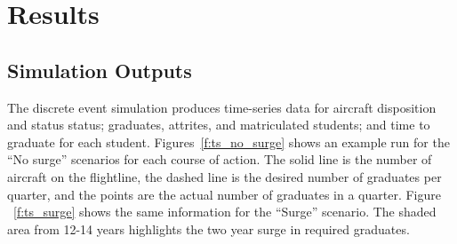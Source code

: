 \documentclass[preprint,12pt]{elsarticle}
\begin{document}
\section{Results}
\label{s:Results}



\subsection{Simulation Outputs}

The discrete event simulation produces time-series data for aircraft
disposition and status status; graduates, attrites, and matriculated
students; and time to graduate for each
student. Figures~\ref{f:ts_no_surge} shows an example run for the ``No
surge'' scenarios for each course of action. The solid line is the number of aircraft on the
flightline, the dashed line is the desired number of graduates per
quarter, and the points are the actual number of graduates in a
quarter. Figure ~\ref{f:ts_surge} shows the same information for the
% 
% 
``Surge'' scenario. The shaded area from 12-14 years highlights the
two year surge in required graduates.
\end{document}
